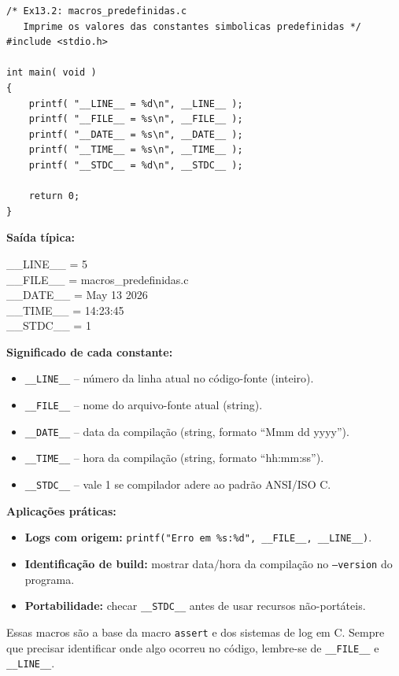 \documentclass[12pt,a4paper]{article}
\begin{document}
\begin{respostabox}
\begin{lstlisting}
/* Ex13.2: macros_predefinidas.c
   Imprime os valores das constantes simbolicas predefinidas */
#include <stdio.h>

int main( void )
{
    printf( "__LINE__ = %d\n", __LINE__ );
    printf( "__FILE__ = %s\n", __FILE__ );
    printf( "__DATE__ = %s\n", __DATE__ );
    printf( "__TIME__ = %s\n", __TIME__ );
    printf( "__STDC__ = %d\n", __STDC__ );

    return 0;
}
\end{lstlisting}

\textbf{Saída típica:}
\begin{saida}
\_\_LINE\_\_ = 5\\
\_\_FILE\_\_ = macros\_predefinidas.c\\
\_\_DATE\_\_ = May 13 2026\\
\_\_TIME\_\_ = 14:23:45\\
\_\_STDC\_\_ = 1
\end{saida}

\textbf{Significado de cada constante:}
\begin{itemize}[noitemsep]
  \item \texttt{\_\_LINE\_\_} -- número da linha atual no código-fonte (inteiro).
  \item \texttt{\_\_FILE\_\_} -- nome do arquivo-fonte atual (string).
  \item \texttt{\_\_DATE\_\_} -- data da compilação (string, formato ``Mmm dd yyyy'').
  \item \texttt{\_\_TIME\_\_} -- hora da compilação (string, formato ``hh:mm:ss'').
  \item \texttt{\_\_STDC\_\_} -- vale 1 se compilador adere ao padrão ANSI/ISO C.
\end{itemize}

\textbf{Aplicações práticas:}
\begin{itemize}[noitemsep]
  \item \textbf{Logs com origem:} \texttt{printf("Erro em \%s:\%d", \_\_FILE\_\_, \_\_LINE\_\_)}.
  \item \textbf{Identificação de build:} mostrar data/hora da compilação no
  \texttt{--version} do programa.
  \item \textbf{Portabilidade:} checar \texttt{\_\_STDC\_\_} antes de usar
  recursos não-portáteis.
\end{itemize}

\begin{boaprática}
  Essas macros são a base da macro \texttt{assert} e dos sistemas de log em C.
  Sempre que precisar identificar onde algo ocorreu no código, lembre-se de
  \texttt{\_\_FILE\_\_} e \texttt{\_\_LINE\_\_}.
\end{boaprática}
\end{respostabox}
\end{document}
